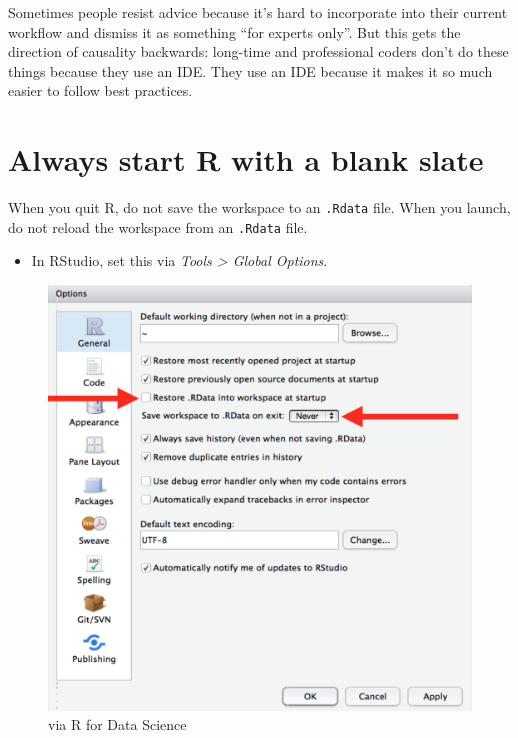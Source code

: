 \documentclass[
  letterpaper,
]{book}
\providecommand{\tightlist}{%
  \setlength{\itemsep}{0pt}\setlength{\parskip}{0pt}}\usepackage{longtable,booktabs,array}
\begin{document}
Sometimes people resist advice because it's hard to incorporate into
their current workflow and dismiss it as something ``for experts only''.
But this gets the direction of causality backwards: long-time and
professional coders don't do these things because they use an IDE. They
use an IDE because it makes it so much easier to follow best practices.

\hypertarget{always-start-r-with-a-blank-slate}{%
\section*{Always start R with a blank
slate}\label{always-start-r-with-a-blank-slate}}

When you quit R, do not save the workspace to an \texttt{.Rdata} file.
When you launch, do not reload the workspace from an \texttt{.Rdata}
file.

\begin{itemize}
\tightlist
\item
  In RStudio, set this via \emph{Tools \textgreater{} Global Options}.
\end{itemize}

\begin{figure}

{\centering \includegraphics[width=1\textwidth,height=\textheight]{./img/rstudio-workspace.png}

}

\caption{via R for Data Science}

\end{figure}
\end{document}
